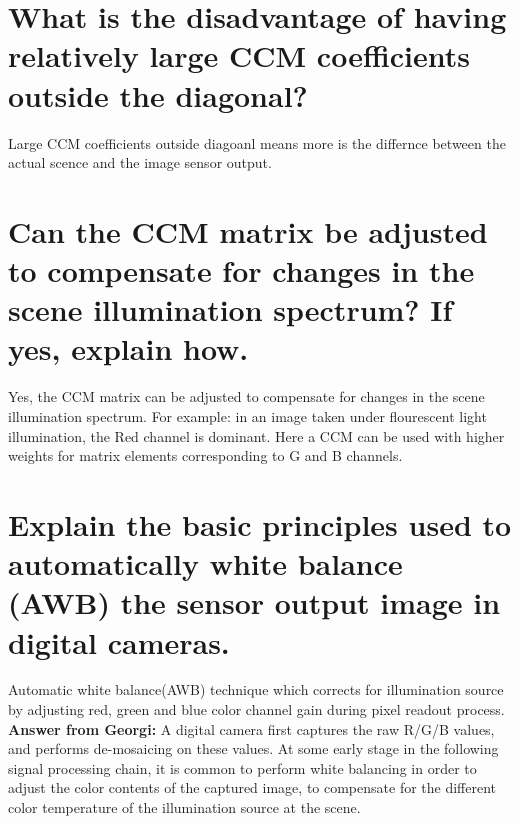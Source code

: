 \documentclass{article}
\begin{document}
\section{What is the disadvantage of having relatively large CCM coefficients 
outside the diagonal?}
Large CCM coefficients outside diagoanl means more is the differnce between the actual scence 
and the image sensor output.

\section{Can the CCM matrix be adjusted to compensate for changes in the 
scene illumination spectrum? If yes, explain how.}
Yes, the CCM matrix can be adjusted to compensate for changes in the scene illumination 
spectrum. For example: in an image taken under flourescent light illumination, the Red channel 
is dominant. Here a CCM can be used with higher weights for matrix elements corresponding to 
G and B channels.

\section{Explain the basic principles used to automatically white balance (AWB) 
the sensor output image in digital cameras.}
Automatic white balance(AWB) technique which corrects for illumination source by adjusting red, green and blue color channel gain during pixel readout process. \\

\textbf{Answer from Georgi: } A digital camera first captures the raw R/G/B values, and performs de-mosaicing on these values. At
some early stage in the following signal processing chain, it is common to perform white balancing in
order to adjust the color contents of the captured image, to compensate for the different color temperature of the illumination source at the scene.\newline
\end{document}
